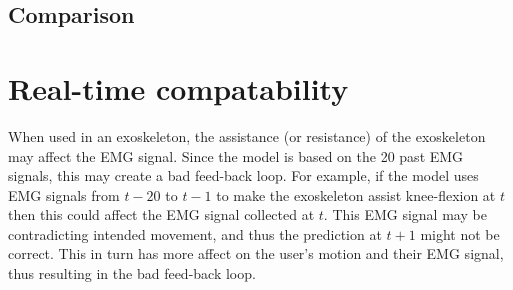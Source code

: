 \documentclass[../main.tex]{subfiles}
\begin{document}
\subsection{Comparison}


\section{Real-time compatability}
\label{sec:discussion_real-time}
When used in an exoskeleton, the assistance (or resistance) of the exoskeleton may affect the \ac{EMG} signal.
Since the model is based on the 20 past \ac{EMG} signals, this may create a bad feed-back loop.
For example, if the model uses \ac{EMG} signals from $t-20$ to $t-1$ to make the exoskeleton assist knee-flexion at $t$ then this could affect the \ac{EMG} signal collected at $t$.
This \ac{EMG} signal may be contradicting intended movement, and thus the prediction at $t+1$ might not be correct.
This in turn has more affect on the user's motion and their \ac{EMG} signal, thus resulting in the bad feed-back loop.
\end{document}
